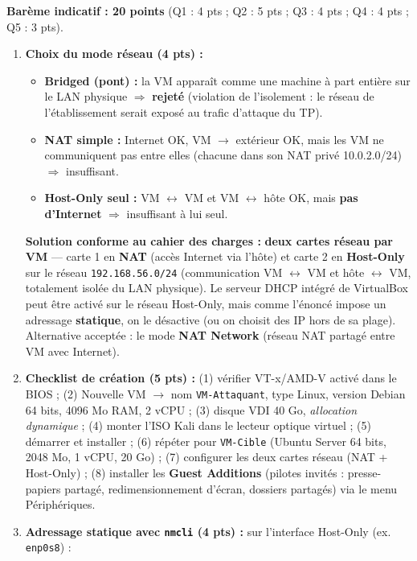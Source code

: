 \documentclass[11pt]{article}
\begin{document}
\begin{corrige}
\textbf{Barème indicatif : 20 points} (Q1 : 4 pts ; Q2 : 5 pts ; Q3 : 4 pts ; Q4 : 4 pts ; Q5 : 3 pts).

\begin{enumerate}
    \item \textbf{Choix du mode réseau (4 pts) :}
    \begin{itemize}
        \item \textbf{Bridged (pont) :} la VM apparaît comme une machine à part entière sur le LAN physique $\Rightarrow$ \textbf{rejeté} (violation de l'isolement : le réseau de l'établissement serait exposé au trafic d'attaque du TP).
        \item \textbf{NAT simple :} Internet OK, VM $\to$ extérieur OK, mais les VM ne communiquent pas entre elles (chacune dans son NAT privé 10.0.2.0/24) $\Rightarrow$ insuffisant.
        \item \textbf{Host-Only seul :} VM $\leftrightarrow$ VM et VM $\leftrightarrow$ hôte OK, mais \textbf{pas d'Internet} $\Rightarrow$ insuffisant à lui seul.
    \end{itemize}
    \textbf{Solution conforme au cahier des charges :} \textbf{deux cartes réseau par VM} — carte 1 en \textbf{NAT} (accès Internet via l'hôte) et carte 2 en \textbf{Host-Only} sur le réseau \texttt{192.168.56.0/24} (communication VM $\leftrightarrow$ VM et hôte $\leftrightarrow$ VM, totalement isolée du LAN physique). Le serveur DHCP intégré de VirtualBox peut être activé sur le réseau Host-Only, mais comme l'énoncé impose un adressage \textbf{statique}, on le désactive (ou on choisit des IP hors de sa plage). Alternative acceptée : le mode \textbf{NAT Network} (réseau NAT partagé entre VM avec Internet).
    \item \textbf{Checklist de création (5 pts) :} (1) vérifier VT-x/AMD-V activé dans le BIOS ; (2) Nouvelle VM $\to$ nom \texttt{VM-Attaquant}, type Linux, version Debian 64 bits, 4096 Mo RAM, 2 vCPU ; (3) disque VDI 40 Go, \emph{allocation dynamique} ; (4) monter l'ISO Kali dans le lecteur optique virtuel ; (5) démarrer et installer ; (6) répéter pour \texttt{VM-Cible} (Ubuntu Server 64 bits, 2048 Mo, 1 vCPU, 20 Go) ; (7) configurer les deux cartes réseau (NAT + Host-Only) ; (8) installer les \textbf{Guest Additions} (pilotes invités : presse-papiers partagé, redimensionnement d'écran, dossiers partagés) via le menu Périphériques.
    \item \textbf{Adressage statique avec \texttt{nmcli} (4 pts) :} sur l'interface Host-Only (ex. \texttt{enp0s8}) :

\end{enumerate}
\end{corrige}
\end{document}
